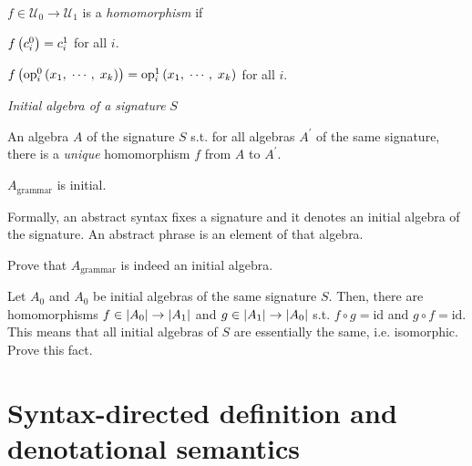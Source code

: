 \begin{enumcirc}
\begin{align*}
{		}
	\end{align*}
	\leavevmode
	$f \in \mathcal{U}_0 \rightarrow \mathcal{U}_1$ is a \emph{homomorphism} if
	\begin{enumrm}
		\item $f \left( c_i^0 \right) = c_i^1$ for all $i$.
		\item $f \left( \textrm{op}_i^0 \left( x_1,\; \cdots ,\; x_k \right) \right) =
			\textrm{op}_i^1 \left( x_1,\; \cdots ,\; x_k \right)$ for all $i$.
	\end{enumrm}

	\item
	\emph{Initial algebra of a signature} $S$
	\begin{enumrm}
		\item An algebra $A$ of the signature $S$ s.t. for all algebras $A^\prime$ of the
		same signature, there is a \emph{unique} homomorphism $f$ from $A$ to
		$A^\prime$.
		\item
		$A_{\textrm{grammar}}$ is initial.
		\item
		Formally, an abstract syntax fixes a signature and it denotes an initial
		algebra of the signature.
		An abstract phrase is an element of that algebra.
	\end{enumrm}

	\begin{exercise}
		Prove that $A_{\textrm{grammar}}$ is indeed an initial algebra.
	\end{exercise}

	\begin{exercisetab}
		Let $A_0$ and $A_0$ be initial algebras of the same signature $S$.
		Then, there are homomorphisms
		$f \in \left\vert A_0 \right\vert \rightarrow \left\vert A_1 \right\vert$ and
		$g \in \left\vert A_1 \right\vert \rightarrow \left\vert A_0 \right\vert$ s.t. $f \circ g = \textrm{id}$ and
		$g \circ f = \textrm{id}$.
		This means that all initial algebras of $S$ are essentially the same, i.e.
		isomorphic. Prove this fact.
	\end{exercisetab}

\end{enumcirc}

\section{Syntax-directed definition and denotational semantics}

